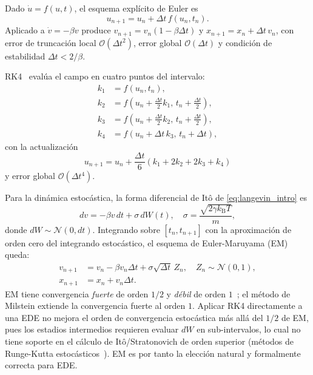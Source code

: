 \documentclass[aps,prl,twocolumn,showpacs,superscriptaddress,longbibliography]{revtex4-2}
\newcommand{\kB}{k_{\mathrm{B}}}
\newcommand{\dt}{\Delta t}
\begin{document}
	Dado $\dot{u}=f(u,t)$, el esquema explícito de Euler es
	\begin{equation}
		u_{n+1} = u_n + \dt\,f(u_n,t_n).
	\end{equation}
	Aplicado a $\dot{v}=-\beta v$ produce $v_{n+1} = v_n(1-\beta\dt)$ y
	$x_{n+1}=x_n+\dt\,v_n$, con error de truncación local $\mathcal{O}(\dt^2)$,
	error global $\mathcal{O}(\dt)$ y condición de estabilidad $\dt<2/\beta$.
	
	RK4~\cite{Press2007} evalúa el campo en cuatro puntos del intervalo:
	\begin{subequations}
		\label{eq:rk4}
		\begin{align}
			k_1 &= f(u_n,t_n),\\
			k_2 &= f\!\left(u_n+\tfrac{\dt}{2}k_1,\,t_n+\tfrac{\dt}{2}\right),\\
			k_3 &= f\!\left(u_n+\tfrac{\dt}{2}k_2,\,t_n+\tfrac{\dt}{2}\right),\\
			k_4 &= f\!\left(u_n+\dt\,k_3,\,t_n+\dt\right),
		\end{align}
	\end{subequations}
	con la actualización
	\begin{equation}
		u_{n+1} = u_n + \frac{\dt}{6}(k_1+2k_2+2k_3+k_4)
	\end{equation}
	y error global $\mathcal{O}(\dt^4)$.
	
	Para la dinámica estocástica, la forma diferencial de Itô de
	\eqref{eq:langevin_intro} es
	\begin{equation}
		dv = -\beta v\,dt + \sigma\,dW(t),\quad
		\sigma = \frac{\sqrt{2\gamma\kB T}}{m},
	\end{equation}
	donde $dW\sim\mathcal{N}(0,dt)$.  Integrando sobre $[t_n,t_{n+1}]$
	con la aproximación de orden cero del integrando estocástico, el esquema
	de Euler-Maruyama (EM) queda:
	\begin{subequations}
		\label{eq:em}
		\begin{align}
			v_{n+1} &= v_n - \beta v_n\dt + \sigma\sqrt{\dt}\,Z_n,\quad
			Z_n\sim\mathcal{N}(0,1), \\
			x_{n+1} &= x_n + v_n\dt.
		\end{align}
	\end{subequations}
	EM tiene convergencia \textit{fuerte} de orden $1/2$ y \textit{débil} de
	orden $1$~\cite{Kloeden1992}; el método de Milstein extiende la convergencia
	fuerte al orden $1$.  Aplicar RK4 directamente a una EDE no mejora el orden
	de convergencia estocástica más allá del $1/2$ de EM, pues los estadios
	intermedios requieren evaluar $dW$ en sub-intervalos, lo cual no tiene
	soporte en el cálculo de Itô/Stratonovich de orden superior
	(métodos de Runge-Kutta estocásticos~\cite{Leimkuhler2015}).
	EM es por tanto la elección natural y formalmente correcta para EDE.
	
\end{document}
